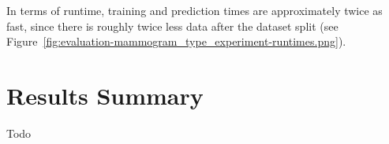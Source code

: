 In terms of runtime, training and prediction times are approximately twice as fast, since there is roughly twice less data after the dataset split (see Figure~\ref{fig:evaluation-mammogram_type_experiment-runtimes.png}).


\section{Results Summary}

Todo